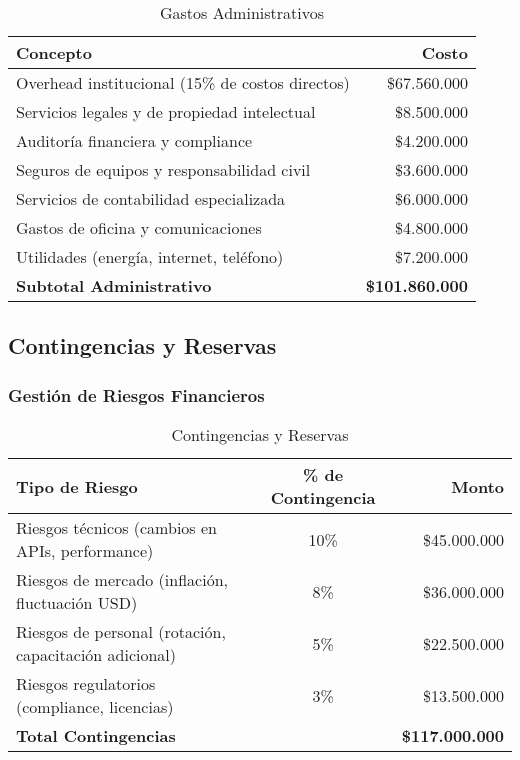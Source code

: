 \begin{table}[H]
    \centering
    \caption{Gastos Administrativos}
    \label{tab:administrativos}
    \small
    \begin{tabular}{|l|r|}
        \hline
        \textbf{Concepto} & \textbf{Costo} \\
        \hline
        Overhead institucional (15\% de costos directos) & \$67.560.000 \\
        \hline
        Servicios legales y de propiedad intelectual & \$8.500.000 \\
        \hline
        Auditoría financiera y compliance & \$4.200.000 \\
        \hline
        Seguros de equipos y responsabilidad civil & \$3.600.000 \\
        \hline
        Servicios de contabilidad especializada & \$6.000.000 \\
        \hline
        Gastos de oficina y comunicaciones & \$4.800.000 \\
        \hline
        Utilidades (energía, internet, teléfono) & \$7.200.000 \\
        \hline
        \textbf{Subtotal Administrativo} & \textbf{\$101.860.000} \\
        \hline
    \end{tabular}
\end{table}

\subsection{Contingencias y Reservas}

\subsubsection{Gestión de Riesgos Financieros}

\begin{table}[H]
    \centering
    \caption{Contingencias y Reservas}
    \label{tab:contingencias}
    \small
    \begin{tabular}{|l|c|r|}
        \hline
        \textbf{Tipo de Riesgo} & \textbf{\% de Contingencia} & \textbf{Monto} \\
        \hline
        Riesgos técnicos (cambios en APIs, performance) & 10\% & \$45.000.000 \\
        \hline
        Riesgos de mercado (inflación, fluctuación USD) & 8\% & \$36.000.000 \\
        \hline
        Riesgos de personal (rotación, capacitación adicional) & 5\% & \$22.500.000 \\
        \hline
        Riesgos regulatorios (compliance, licencias) & 3\% & \$13.500.000 \\
        \hline
        \textbf{Total Contingencias} & & \textbf{\$117.000.000} \\
        \hline
    \end{tabular}
\end{table}

